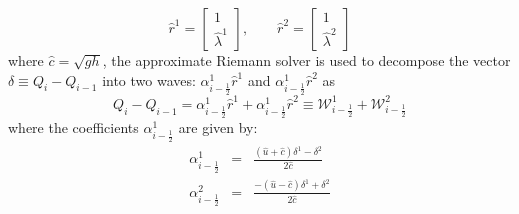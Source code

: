 \documentclass[11pt,a4paper]{article}
\begin{document}
	\begin{equation}
		\hat{r}^1 =  \begin{bmatrix} 1 \\ 	\hat{\lambda}^1 \end{bmatrix}, \qquad 	\hat{r}^2 =  
		\begin{bmatrix} 1 \\ 	\hat{\lambda}^2 \end{bmatrix}
		\label{vec}
	\end{equation}
	where $\hat{c} = \sqrt{gh}$, the approximate Riemann solver is used to decompose the vector  $ \delta \equiv Q_{i} - Q_{i-1}$ into two waves: $\alpha_{i-\frac{1}{2}}^{1} \hat{r}^1$ and $\alpha_{i-\frac{1}{2}}^{1} \hat{r}^2$ as 
	\begin{equation}
		Q_{i} - Q_{i-1} = \alpha_{i-\frac{1}{2}}^{1} \hat{r}^1 + \alpha_{i-\frac{1}{2}}^{1} \hat{r}^2 \equiv \mathcal{W}_{i-\frac{1}{2}}^{1} + \mathcal{W}_{i-\frac{1}{2}}^{2}
	\end{equation}
	where the coefficients $\alpha_{i-\frac{1}{2}}^{1}$ are given by:
	\begin{eqnarray}
		\alpha_{i-\frac{1}{2}}^{1} &=& \frac{(\hat{u} + \hat{c})\delta^{1} - \delta^2}{2\hat{c}}\\
		\alpha_{i-\frac{1}{2}}^{2} &=& \frac{-(\hat{u} - \hat{c})\delta^{1} + \delta^2}{2\hat{c}}
	\end{eqnarray}
	
\end{document}
